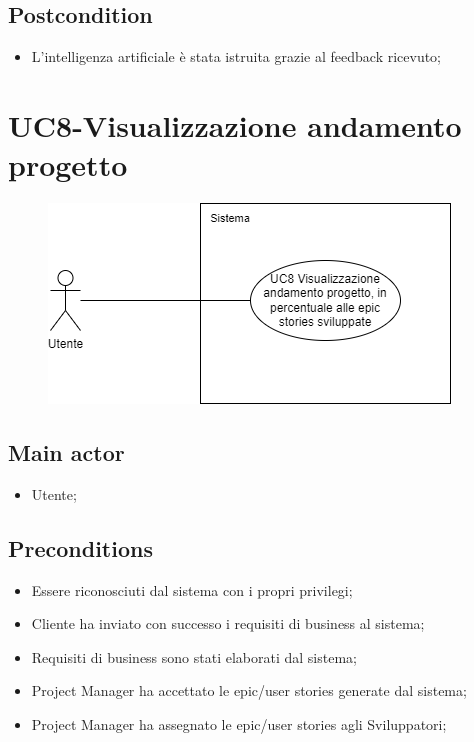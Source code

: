 \documentclass{article}
\begin{document}
        \subsection*{Postcondition} 
        \begin{itemize}
            \item L'intelligenza artificiale è stata istruita grazie al feedback ricevuto;
        \end{itemize}

\section{UC8-Visualizzazione andamento progetto}
    \begin{figure}[h]
      \centering
      \includegraphics{./imgUML/UC8.png}
      \label{fig:immagine}
    \end{figure}
    
    \subsection*{Main actor}
        \begin{itemize}
            \item Utente; 
        \end{itemize}
        
    \subsection*{Preconditions}
        \begin{itemize}
            \item Essere riconosciuti dal sistema con i propri privilegi;
            \item Cliente ha inviato con successo i requisiti di business al sistema;
            \item Requisiti di business sono stati elaborati dal sistema;
            \item Project Manager ha accettato le epic/user stories generate dal sistema;
            \item Project Manager ha assegnato le epic/user stories agli Sviluppatori;
        \end{itemize}
        
\end{document}
